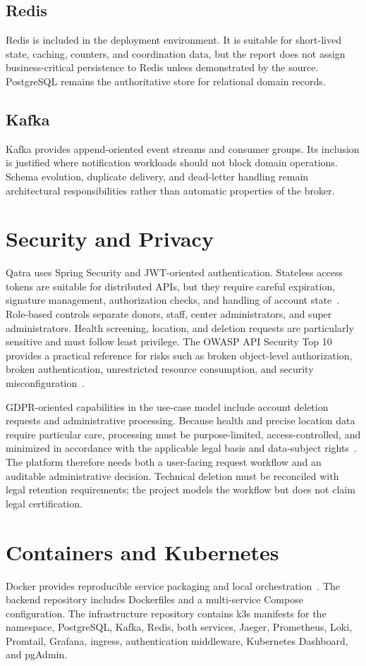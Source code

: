 \subsection{Redis}
Redis is included in the deployment environment. It is suitable for short-lived state, caching, counters, and coordination data, but the report does not assign business-critical persistence to Redis unless demonstrated by the source. PostgreSQL remains the authoritative store for relational domain records.

\subsection{Kafka}
Kafka provides append-oriented event streams and consumer groups. Its inclusion is justified where notification workloads should not block domain operations. Schema evolution, duplicate delivery, and dead-letter handling remain architectural responsibilities rather than automatic properties of the broker.

\section{Security and Privacy}
Qatra uses Spring Security and JWT-oriented authentication. Stateless access tokens are suitable for distributed APIs, but they require careful expiration, signature management, authorization checks, and handling of account state~\cite{jwt}. Role-based controls separate donors, staff, center administrators, and super administrators. Health screening, location, and deletion requests are particularly sensitive and must follow least privilege. The OWASP API Security Top 10 provides a practical reference for risks such as broken object-level authorization, broken authentication, unrestricted resource consumption, and security misconfiguration~\cite{owaspApiSecurity}.

GDPR-oriented capabilities in the use-case model include account deletion requests and administrative processing. Because health and precise location data require particular care, processing must be purpose-limited, access-controlled, and minimized in accordance with the applicable legal basis and data-subject rights~\cite{gdpr}. The platform therefore needs both a user-facing request workflow and an auditable administrative decision. Technical deletion must be reconciled with legal retention requirements; the project models the workflow but does not claim legal certification.

\section{Containers and Kubernetes}
Docker provides reproducible service packaging and local orchestration~\cite{docker}. The backend repository includes Dockerfiles and a multi-service Compose configuration. The infrastructure repository contains k3s manifests for the namespace, PostgreSQL, Kafka, Redis, both services, Jaeger, Prometheus, Loki, Promtail, Grafana, ingress, authentication middleware, Kubernetes Dashboard, and pgAdmin.


